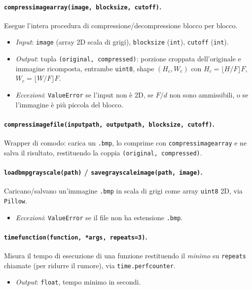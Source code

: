 \documentclass[11pt,a4paper]{article}
\makeatletter
\let\@origtexttt\texttt
\renewcommand{\texttt}[1]{{\def\_{\textunderscore\discretionary{}{}{}}\@origtexttt{#1}}}
\makeatother
\begin{document}
\paragraph{\texttt{compress\_image\_array(image, block\_size, cutoff)}.}
Esegue l'intera procedura di compressione/decompressione blocco per blocco.
\begin{itemize}
  \item \emph{Input}: \texttt{image} (array 2D scala di grigi), \texttt{block\_size}
        (\texttt{int}), \texttt{cutoff} (\texttt{int}).
  \item \emph{Output}: tupla \texttt{(original, compressed)}: porzione
        croppata dell'originale e immagine ricomposta, entrambe \texttt{uint8},
        shape $(H_c,W_c)$ con $H_c=\lfloor H/F\rfloor F$, $W_c=\lfloor W/F\rfloor F$.
  \item \emph{Eccezioni}: \texttt{ValueError} se l'input non è 2D, se $F/d$
        non sono ammissibili, o se l'immagine è più piccola del blocco.
\end{itemize}

\paragraph{\texttt{compress\_image\_file(input\_path, output\_path, block\_size, cutoff)}.}
Wrapper di comodo: carica un \texttt{.bmp}, lo comprime con
\texttt{compress\_image\_array} e ne salva il risultato, restituendo la coppia
\texttt{(original, compressed)}.

\paragraph{\texttt{load\_bmp\_grayscale(path)} / \texttt{save\_grayscale\_image(path, image)}.}
Caricano/salvano un'immagine \texttt{.bmp} in scala di grigi come array
\texttt{uint8} 2D, via \texttt{Pillow}.
\begin{itemize}
  \item \emph{Eccezioni}: \texttt{ValueError} se il file non ha estensione
        \texttt{.bmp}.
\end{itemize}

\paragraph{\texttt{time\_function(function, *args, repeats=3)}.}
Misura il tempo di esecuzione di una funzione restituendo il \emph{minimo} su
\texttt{repeats} chiamate (per ridurre il rumore), via
\texttt{time.perf\_counter}.
\begin{itemize}
  \item \emph{Output}: \texttt{float}, tempo minimo in secondi.
\end{itemize}
\end{document}
